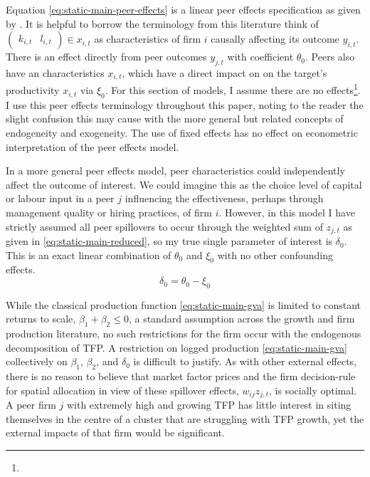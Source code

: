 \par
Equation \eqref{eq:static-main-peer-effects} is a linear peer effects specification as given by \cite{Manski1993}.
It is helpful to borrow the terminology from this literature think of
$\begin{pmatrix}
    k_{i,t} &   l_{i,t}
\end{pmatrix}\in x_{i,t}$
as  characteristics of firm ${i}$ causally affecting its outcome $y_{i,t}$.
There is an  effect directly from peer outcomes $y_{j,t}$ with coefficient $\theta_0$.
Peers also have an  characteristics $x_{i,t}$,
which have a direct impact on on the target's productivity $x_{i,t}$ via $\xi_0$.
For this section of models, I assume there are no  effects\footnote{}.
I use this peer effects terminology throughout this paper,
noting to the reader the slight confusion this may cause with the more general but related concepts of endogeneity and exogeneity.
The use of fixed effects has no effect on econometric interpretation of the peer effects model.
\par
In a more general peer effects model, peer characteristics could independently affect the outcome of interest.
We could imagine this as the choice level of capital or labour input in a peer $j$
influencing the effectiveness, perhaps through management quality or hiring practices, of firm $i$.
However, in this model I have strictly assumed all peer spillovers to occur through the
weighted sum of $z_{j,t}$ as given in \eqref{eq:static-main-reduced}, so my true single parameter of interest is $\delta_0$.
This is an exact linear combination of $\theta_0$ and $\xi_0$ with no other confounding effects.
\begin{equation}
    \delta_0 = \theta_0 - \xi_0
\end{equation}
\par
While the classical production function \eqref{eq:static-main-gva} is limited to constant returns to scale,
$\beta_1 + \beta_2\leq 0$, a standard assumption across the growth and firm production literature,
no such restrictions for the firm occur with the endogenous decomposition of TFP.
A restriction on logged production \eqref{eq:static-main-gva} collectively on $\beta_1$, $\beta_2$, and $\delta_0$
is difficult to justify.
As with other external effects, there is no reason to believe that market factor prices
and the firm decision-rule for spatial allocation in view of these spillover effects, $w_{ij}z_{j,t}$, is socially optimal.
A peer firm $j$ with extremely high and growing TFP has little interest in siting themselves
in the centre of a cluster that are struggling with TFP growth,
yet the external impacts of that firm would be significant.

